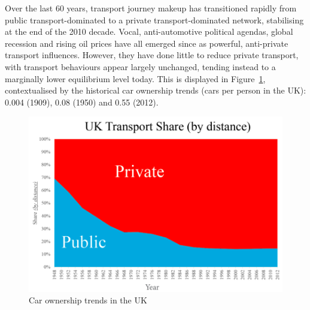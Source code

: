 \documentclass[conference]{IEEEtran}
\begin{document}
Over the last 60 years, transport journey makeup has transitioned
rapidly from public transport-dominated to a private
transport-dominated network, stabilising at the end of the 2010
decade. Vocal, anti-automotive political agendas, global recession and
rising oil prices have all emerged since as powerful, anti-private
transport influences. However, they have done little to reduce private
transport, with transport behaviours appear largely unchanged, tending
instead to a marginally lower equilibrium level today. This is
displayed in Figure~\ref{fig:uktransportshare}, contextualised by the
historical car ownership trends (cars per person in the UK): 0.004
(1909), 0.08 (1950) and 0.55 (2012).


\begin{figure}[!htp]
\centering
\includegraphics[width=\columnwidth]{images/uktransportshare.png}
\caption{Car ownership trends in the UK}
\label{fig:uktransportshare}
\end{figure}

\end{document}
